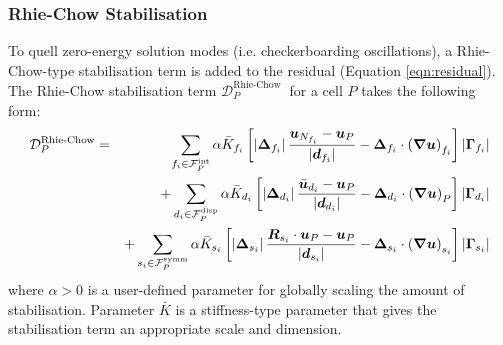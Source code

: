 \documentclass[sn-mathphys,Numbered]{sn-jnl}%
\newcommand{\bb}{\boldsymbol}
\begin{document}
\subsubsection{Rhie-Chow Stabilisation} \label{sec:RhieChow}
To quell zero-energy solution modes (i.e. checkerboarding oscillations), a Rhie-Chow-type stabilisation term \cite{Rhie1983} is added to the residual (Equation \ref{eqn:residual}).
The Rhie-Chow stabilisation term  $\mathcal{D}_P^{\text {Rhie-Chow }}$ for a cell $P$ takes the following form:
\begin{eqnarray} \label{eq:RhieChow}
	\mathcal{D}_P^{\text {Rhie-Chow}}
	&=& \sum_{f_i \in \mathcal{F}^{\text{int}}_P} \alpha \bar{K}_{f_i} \left[
		\left|\bb{\Delta}_{f_i} \right| \frac{ \bb{u}_{N_{f_i}} - \bb{u}_P}{\left|\bb{d}_{f_i}\right|}	- \bb{\Delta}_{f_i} \cdot \left(\bb{\nabla} \bb{u} \right)_{f_i}
		\right]    \left|\bb{\Gamma}_{f_i}\right| \notag \\
	&&+ \sum_{d_i \in \mathcal{F}^{\text{disp}}_P} \alpha \bar{K}_{d_i} \left[
		\left|\bb{\Delta}_{d_i} \right| \frac{ \bar{\bb{u}}_{d_i} - \bb{u}_P}{\left|\bb{d}_{d_i}\right|}	- \bb{\Delta}_{d_i} \cdot \left(\bb{\nabla} \bb{u} \right)_{P}
		\right]    \left|\bb{\Gamma}_{d_i}\right| \notag \\
	&&+ \sum_{s_i \in \mathcal{F}^{\text{symm}}_P} \alpha \bar{K}_{s_i} \left[
		\left|\bb{\Delta}_{s_i} \right| \frac{ \bb{R}_{s_i} \cdot \bb{u}_{P} - \bb{u}_P}{\left|\bb{d}_{s_i}\right|} - \bb{\Delta}_{s_i} \cdot \left(\bb{\nabla} \bb{u} \right)_{s_i}
		\right]    \left|\bb{\Gamma}_{s_i}\right|
\end{eqnarray}
where $\alpha > 0$ is a user-defined parameter for globally scaling the amount of stabilisation.
Parameter $\bar{K}$ is a stiffness-type parameter that gives the stabilisation term an appropriate scale and dimension.
\end{document}
